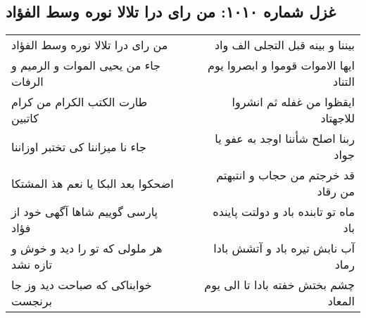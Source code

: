\begin{center}
\section*{غزل شماره ۱۰۱۰: من رای درا تلالا نوره وسط الفؤاد}
\label{sec:1010}
\begin{longtable}{l p{0.5cm} r}
من رای درا تلالا نوره وسط الفؤاد
&&
بیننا و بینه قبل التجلی الف واد
\\
جاء من یحیی الموات و الرمیم و الرفات
&&
ایها الاموات قوموا و ابصروا یوم التناد
\\
طارت الکتب الکرام من کرام کاتبین
&&
ایقظوا من غفله ثم انشروا للاجهتاد
\\
جاء نا میزاننا کی تختبر اوزاننا
&&
ربنا اصلح شأننا اوجد به عفو یا جواد
\\
اضحکوا بعد البکا یا نعم هذ المشتکا
&&
قد خرجتم من حجاب و انتبهتم من رقاد
\\
پارسی گوییم شاها آگهی خود از فؤاد
&&
ماه تو تابنده باد و دولتت پاینده باد
\\
هر ملولی که تو را دید و خوش و تازه نشد
&&
آب نابش تیره باد و آتشش بادا رماد
\\
خوابناکی که صباحت دید وز جا برنجست
&&
چشم بختش خفته بادا تا الی یوم المعاد
\\
\end{longtable}
\end{center}
